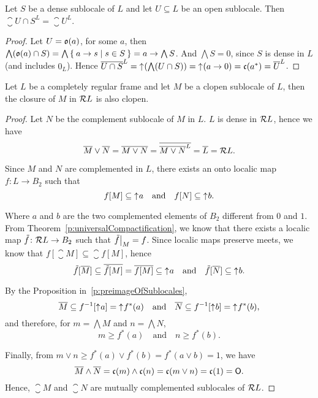 \begin{lemma}\label{p:closureIntersectedByDense}
    Let $S$ be a dense sublocale of $L$ and let $U\subseteq L$ be an open sublocale. Then $\closure{U\cap S}^L = \closure{U}^L$.
\end{lemma}
\begin{proof}
    Let $U = \mathfrak{o}(a)$, for some $a$, then $\bigwedge (\mathfrak{o}(a)\cap S) = \bigwedge \Set{ a\to s | s \in S } = a\to \bigwedge S$. And $\bigwedge S = 0$, since $S$ is dense in $L$ (and includes $0_L$). Hence $\overline{U\cap S}^L = \mathord{\uparrow}\mkern1mu (\bigwedge (U\cap S)) = \mathord{\uparrow}\mkern1mu(a\to 0) = \mathfrak{c}(a^*) = \overline{U}^L$.
\end{proof}

\begin{lemma}\label{p:closureOfClopen}
    Let $L$ be a completely regular frame and let $M$ be a clopen sublocale of $L$, then the closure of $M$ in $\mathcal{R} L$ is also clopen.
\end{lemma}
\begin{proof}
    Let $N$ be the complement sublocale of $M$ in $L$. $L$ is dense in $\mathcal{R} L$, hence we have
    $$ \overline{M}\vee \overline{N} = \overline{M\vee N} = \overline{\overline{M\vee N}^L} = \overline{L} = \mathcal{R} L. $$

    Since $M$ and $N$ are complemented in $L$, there exists an onto localic map $f\colon L\to B_2$ such that
    $$ f[M] \subseteq \mathord{\uparrow}\mkern1mu a\quad\text{and}\quad f[N]\subseteq \mathord{\uparrow}\mkern1mu b. $$

    \noindent Where $a$ and $b$ are the two complemented elements of $B_2$ different from $0$ and $1$.
    From Theorem~\ref{p:universalCompactification}, we know that there exists a localic map $\tilde f\colon \mathcal{R} L\to B_2$ such that $\restr{\tilde f}{M} = f$.
    Since localic maps preserve meets, we know that $f[\closure M]\subseteq \closure{f[M]}$, hence
    $$ \tilde f[\overline{M}] \subseteq \overline{\tilde f[M]} = \overline{f[M]} \subseteq \mathord{\uparrow}\mkern1mu a\quad\text{and}\quad \tilde f[\overline{N}] \subseteq \mathord{\uparrow}\mkern1mu b. $$

    \noindent By the Proposition in~\ref{p:preimageOfSublocales},
    $$ \overline{M} \subseteq f^{-1}[\mathord{\uparrow}\mkern1mu a] = \mathord{\uparrow}\mkern1mu f^*(a) \quad\text{and}\quad \overline{N} \subseteq f^{-1}[\mathord{\uparrow}\mkern1mu b] = \mathord{\uparrow}\mkern1mu f^*(b), $$
    and therefore, for $m = \bigwedge M$ and $n = \bigwedge N$,
    $$ m \geq f^*(a)\quad\text{and}\quad n \geq f^*(b).$$

    \noindent Finally, from $m\vee n \geq f^*(a)\vee f^*(b) = f^*(a\vee b) = 1$, we have
    $$ \overline{M}\wedge \overline{N} = \mathfrak{c}(m)\wedge \mathfrak{c}(n) = \mathfrak{c}(m\vee n) = \mathfrak{c}(1) = \mathsf{O}. $$
    Hence, $\closure{M}$ and $\closure{N}$ are mutually complemented sublocales of $\mathcal{R} L$.
\end{proof}

